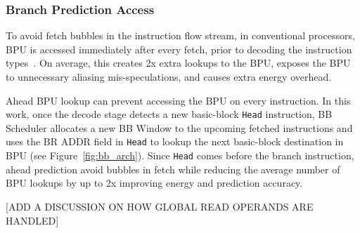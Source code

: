 \subsubsection{Branch Prediction Access}
\label{sec:bpu}

To avoid fetch bubbles in the instruction flow stream, in conventional
processors, BPU is accessed immediately after every fetch, prior to decoding the
instruction types~\cite{ref:EV8}. On average, this creates 2x extra lookups to
the BPU, exposes the BPU to unnecessary aliasing mis-speculations, and causes
extra energy overhead.

Ahead BPU lookup can prevent accessing the BPU on every instruction. In this
work, once the decode stage detects a new basic-block \texttt{Head} instruction,
    BB Scheduler allocates a new BB Window to the upcoming fetched instructions
    and uses the BR ADDR field in \texttt{Head} to lookup the next basic-block
    destination in BPU (see Figure~\ref{fig:bb_arch}). Since \texttt{Head} comes
    before the branch instruction, ahead prediction avoid bubbles in fetch while
    reducing the average number of BPU lookups by up to 2x improving energy and
    prediction accuracy.


[ADD A DISCUSSION ON HOW GLOBAL READ OPERANDS ARE HANDLED]

